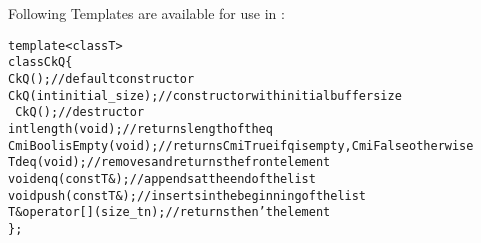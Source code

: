 



Following Templates are available for use in \CC{}:

\begin{alltt}
template<class T>
class CkQ \{
  CkQ();  // default constructor
  CkQ(int initial_size); // constructor with initial buffer size
  ~CkQ(); // destructor
  int length(void); // returns length of the q
  CmiBool isEmpty(void); // returns CmiTrue if q is empty, CmiFalse otherwise
  T deq(void); // removes and returns the front element
  void enq(const T\&); // appends at the end of the list
  void push(const T\&); // inserts in the beginning of the list
  T\& operator[](size_t n); // returns the n'th element
\};
\end{alltt}

